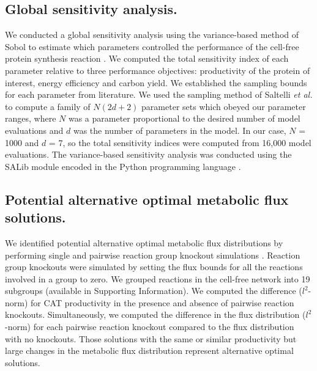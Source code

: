 \documentclass[journal=asbcd6,manuscript=article]{achemso}
\begin{document}
\subsection*{Global sensitivity analysis.}
We conducted a global sensitivity analysis using the variance-based method of Sobol to estimate which parameters controlled the performance of the cell-free protein synthesis reaction \citep{SOBOL_METHOD}.
We computed the total sensitivity index of each parameter relative to three performance objectives: productivity of the protein of interest, energy efficiency and carbon yield.
We established the sampling bounds for each parameter from literature.
We used the sampling method of Saltelli \textit{et al.} \citep{Saltelli:2010} to compute a family of $N\left(2d+2\right)$ parameter sets which obeyed our parameter ranges,
where $N$ was a parameter proportional to the desired number of model evaluations and $d$ was the number of parameters in the model. In our case, $N$ = 1000 and $d$ = 7, so the total sensitivity indices were computed from 16,000 model evaluations. The variance-based sensitivity analysis was conducted using the SALib module encoded in the Python programming language \citep{SALIB}.

\subsection*{Potential alternative optimal metabolic flux solutions.}
We identified potential alternative optimal metabolic flux distributions by performing single and pairwise reaction group knockout simulations \cite{Mahadevan2003264}.
Reaction group knockouts were simulated by setting the flux bounds for all the reactions involved in a group to zero.
We grouped reactions in the cell-free network into 19 subgroups (available in Supporting Information).
We computed the difference ($l^{2}$-norm) for CAT productivity in the presence and absence of pairwise reaction knockouts.
Simultaneously, we computed the difference in the flux distribution ($l^{2}$-norm) for each pairwise reaction knockout compared to the flux distribution with no knockouts.
Those solutions with the same or similar productivity but large changes in the metabolic flux distribution represent alternative optimal solutions.
\end{document}
